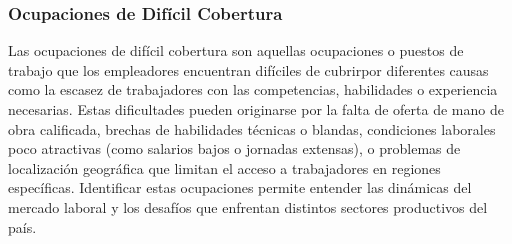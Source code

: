 \documentclass[
  11pt,
]{article}
\begin{document}
\FloatBarrier

\begin{table}

\caption{\label{tbl-contratados_sector}Contratados últimos 12 meses por
sector de actividad económica.}


\end{table}%

\subsubsection{Ocupaciones de Difícil
Cobertura}\label{ocupaciones-de-difuxedcil-cobertura}

Las ocupaciones de difícil cobertura son aquellas ocupaciones o puestos
de trabajo que los empleadores encuentran difíciles de cubrirpor
diferentes causas como la escasez de trabajadores con las competencias,
habilidades o experiencia necesarias. Estas dificultades pueden
originarse por la falta de oferta de mano de obra calificada, brechas de
habilidades técnicas o blandas, condiciones laborales poco atractivas
(como salarios bajos o jornadas extensas), o problemas de localización
geográfica que limitan el acceso a trabajadores en regiones específicas.
Identificar estas ocupaciones permite entender las dinámicas del mercado
laboral y los desafíos que enfrentan distintos sectores productivos del
país.
\end{document}

